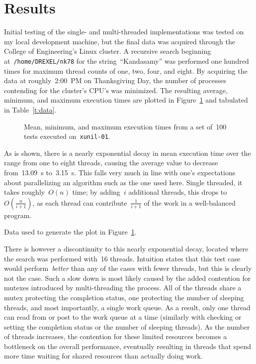 \documentclass{article}
\newcommand{\ttt}[1]{\texttt{#1}}
\begin{document}
\section{Results}
Initial testing of the single- and multi-threaded implementations was tested on
my local development machine, but the final data was acquired through the
College of Engineering's Linux cluster.  A recursive search beginning
at~\ttt{/home/DREXEL/nk78} for the string~``Kandasamy'' was performed one
hundred times for maximum thread counts of one, two, four, and eight.  By
acquiring the data at roughly~2:00~PM on Thanksgiving Day, the number of
processes contending for the cluster's CPU's was minimized.  The resulting
average, minimum, and maximum execution times are plotted in
Figure~\ref{f:plot} and tabulated in Table~\ref{t:data}.
%
\begin{figure}[H]
\centering
	
	\parbox{.6\textwidth}{
	\caption{Mean, minimum, and maximum execution times from a set of~100 tests
	executed on~\ttt{xunil-01}.}
	\label{f:plot}}
\end{figure}
%
As is shown, there is a nearly exponential decay in mean execution time over
the range from one to eight threads, causing the average value to decrease
from~\SI{13.09}{\second} to~\SI{3.15}{\second}.  This falls very much in line
with one's expectations about parallelizing an algorithm such as the one used
here.  Single threaded, it takes roughly~$O(n)$ time; by adding~$i$ additional
threads, this drops to~$O(\frac{n}{i+1})$, as each thread can
contribute~$\frac{1}{i+1}$ of the work in a well-balanced program.
%
\begin{table}[H]
\centering
	
	\parbox{.6\textwidth}{
	\caption{Data used to generate the plot in Figure~\ref{f:plot}.}
	\label{t:data}}
\end{table}
%
There is however a discontinuity to this nearly exponential decay, located
where the search was performed with~16 threads.  Intuition states that this
test case would perform~\emph{better} than any of the cases with fewer threads,
but this is clearly not the case.  Such a slow down is most likely caused by
the added contention for mutexes introduced by multi-threading the process.
All of the threads share a mutex protecting the completion status, one
protecting the number of sleeping threads, and most importantly, a single work
queue.  As a result, only one thread can read from or post to the work queue at
a time (similarly with checking or setting the completion status or the number
of sleeping threads).  As the number of threads increases, the contention for
these limited resources becomes a bottleneck on the overall performance,
eventually resulting in threads that spend more time waiting for shared
resources than actually doing work.
\end{document}

